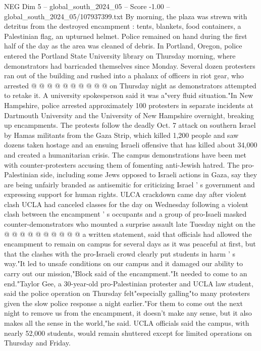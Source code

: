 \begin{textsample}{NEG Dim 5 – global\_south\_2024\_05 – Score -1.00 – global\_south\_2024\_05/107937399.txt}
By morning, the plaza was strewn with detritus from the destroyed encampment : tents, blankets, food containers, a Palestinian flag, an upturned helmet.
Police remained on hand during the first half of the day as the area was cleaned of debris.
In Portland, Oregon, police entered the Portland State University library on Thursday morning, where demonstrators had barricaded themselves since Monday.
Several dozen protesters ran out of the building and rushed into a phalanx of officers in riot gear, who arrested @ @ @ @ @ @ @ @ @ @ on Thursday night as demonstrators attempted to retake it.
A university spokesperson said it was a"very fluid situation."In New Hampshire, police arrested approximately 100 protesters in separate incidents at Dartmouth University and the University of New Hampshire overnight, breaking up encampments.
The protests follow the deadly Oct. 7 attack on southern Israel by Hamas militants from the Gaza Strip, which killed 1,200 people and saw dozens taken hostage and an ensuing Israeli offensive that has killed about 34,000 and created a humanitarian crisis.
The campus demonstrations have been met with counter-protesters accusing them of fomenting anti-Jewish hatred.
The pro-Palestinian side, including some Jews opposed to Israeli actions in Gaza, say they are being unfairly branded as antisemitic for criticizing Israel ' s government and expressing support for human rights.
ULCA crackdown came day after violent clash UCLA had canceled classes for the day on Wednesday following a violent clash between the encampment ' s occupants and a group of pro-Isaeli masked counter-demonstrators who mounted a surprise assault late Tuesday night on the @ @ @ @ @ @ @ @ @ @ a written statement, said that officials had allowed the encampment to remain on campus for several days as it was peaceful at first, but that the clashes with the pro-Israeli crowd clearly put students in harm ' s way."It led to unsafe conditions on our campus and it damaged our ability to carry out our mission,"Block said of the encampment."It needed to come to an end."Taylor Gee, a 30-year-old pro-Palestinian protester and UCLA law student, said the police operation on Thursday felt"especially galling"to many protesters given the slow police response a night earlier."For them to come out the next night to remove us from the encampment, it doesn't make any sense, but it also makes all the sense in the world,"he said.
UCLA officials said the campus, with nearly 52,000 students, would remain shuttered except for limited operations on Thursday and Friday.

\end{textsample}
